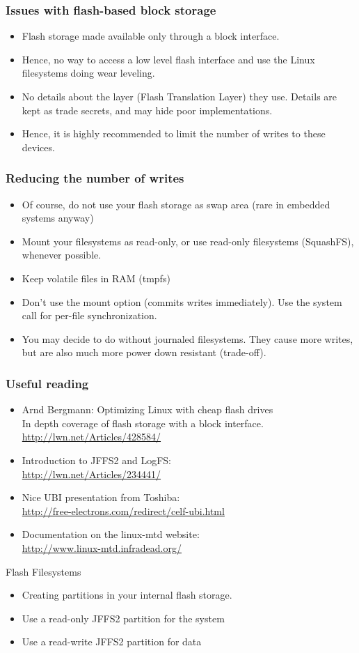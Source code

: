 \begin{frame}
  \frametitle{Issues with flash-based block storage}
  \begin{itemize}
  \item Flash storage made available only through a block interface.
  \item Hence, no way to access a low level flash interface
    and use the Linux filesystems doing wear leveling.
  \item No details about the layer (Flash Translation Layer) they
    use. Details are kept as trade secrets, and may hide poor
    implementations.
  \item Hence, it is highly recommended to limit the number of writes
    to these devices.
  \end{itemize}
\end{frame}

\begin{frame}
  \frametitle{Reducing the number of writes}
  \begin{itemize}
  \item Of course, do not use your flash storage as swap area (rare in
    embedded systems anyway)
  \item Mount your filesystems as read-only, or use read-only
    filesystems (SquashFS), whenever possible.
  \item Keep volatile files in RAM (tmpfs)
  \item Don't use the  mount option (commits writes
    immediately). Use the  system call for per-file
    synchronization.
  \item You may decide to do without journaled filesystems. They cause
    more writes, but are also much more power down resistant
    (trade-off).
  \end{itemize}
\end{frame}

\begin{frame}
  \frametitle{Useful reading}
  \begin{itemize}
  \item Arnd Bergmann: Optimizing Linux with cheap flash drives\\
    In depth coverage of flash storage with a block interface.\\
    \url{http://lwn.net/Articles/428584/}
  \item Introduction to JFFS2 and LogFS:\\
    \url{http://lwn.net/Articles/234441/}
  \item Nice UBI presentation from Toshiba:\\
    \url{http://free-electrons.com/redirect/celf-ubi.html}
  \item Documentation on the linux-mtd website:\\
    \url{http://www.linux-mtd.infradead.org/}
  \end{itemize}
\end{frame}

\setuplabframe
{Flash Filesystems}
{
  \begin{itemize}
  \item Creating partitions in your internal flash storage.
  \item Use a read-only JFFS2 partition for the system
  \item Use a read-write JFFS2 partition for data
  \end{itemize}
}
